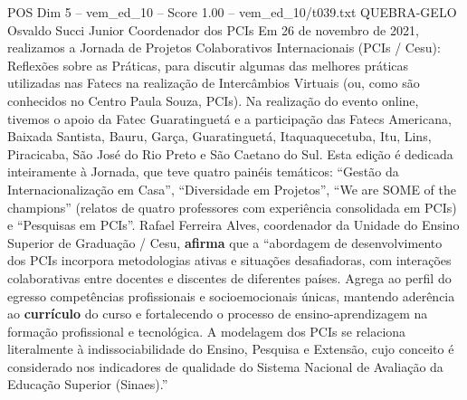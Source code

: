 \begin{textsample}{POS Dim 5 – vem\_ed\_10 – Score 1.00 – vem\_ed\_10/t039.txt}  \label{ex:f5_pos_129}
QUEBRA-GELO Osvaldo Succi Junior Coordenador dos PCIs Em 26 de novembro de 2021, realizamos a Jornada de Projetos Colaborativos Internacionais (PCIs / Cesu): Reflexões sobre as Práticas, para discutir algumas das melhores práticas utilizadas nas Fatecs na realização de Intercâmbios Virtuais (ou, como são conhecidos no Centro Paula Souza, PCIs).
Na realização do evento online, tivemos o apoio da Fatec Guaratinguetá e a participação das Fatecs Americana, Baixada Santista, Bauru, Garça, Guaratinguetá, Itaquaquecetuba, Itu, Lins, Piracicaba, São José do Rio Preto e São Caetano do Sul.
Esta edição é dedicada inteiramente à Jornada, que teve quatro painéis temáticos: “Gestão da Internacionalização em Casa”, “Diversidade em Projetos”, “We are SOME of the champions” (relatos de quatro professores com experiência consolidada em PCIs) e “Pesquisas em PCIs”.
Rafael Ferreira Alves, coordenador da Unidade do Ensino Superior de Graduação / Cesu, \textbf{afirma} que a “abordagem de desenvolvimento dos PCIs incorpora metodologias ativas e situações desafiadoras, com interações colaborativas entre docentes e discentes de diferentes países.
Agrega ao perfil do egresso competências profissionais e socioemocionais únicas, mantendo aderência ao \textbf{currículo} do curso e fortalecendo o processo de ensino-aprendizagem na formação profissional e tecnológica.
A modelagem dos PCIs se relaciona literalmente à indissociabilidade do Ensino, Pesquisa e Extensão, cujo conceito é considerado nos indicadores de qualidade do Sistema Nacional de Avaliação da Educação Superior (Sinaes).”

\end{textsample}
